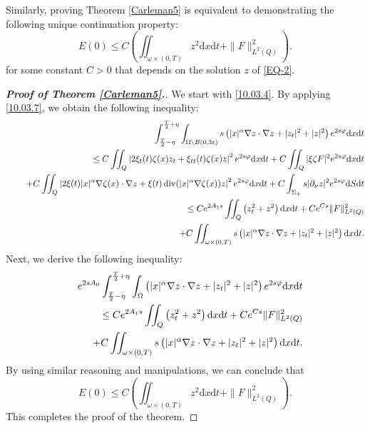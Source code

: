 \documentclass[11pt]{article}
\numberwithin{equation}{section}
\def\pt{\partial}
\def\e{\varepsilon }
\def\vp{\varphi}
\def\bf{\textbf}
\def\pt{\partial}
\def\om{\omega}
\def\Om{\Omega}
\def\al{\alpha}
\def\ts{\times}
\def\f{\frac}
\def\se{\setminus}
\def\df{\mathrm d}
\DeclareMathOperator{\Div}{div}
\begin{document}
		Similarly, proving Theorem \ref{Carleman5} is equivalent to demonstrating the following unique continuation property:
		\begin{equation*}
			E(0)\leq C\left(\iint_{\om\ts (0,T)} z^2\df x\df t+\|F\|_{L^2(Q)}^2\right).
		\end{equation*}
		for some constant $C>0$ that  depends on the solution $z$ of \eqref{EQ-2}.
		\begin{proof}[\rm \bf{{\bf Proof of Theorem \ref{Carleman5}.}}]	
			We start with \eqref{10.03.4}. By applying \eqref{10.03.7}, we obtain the following inequality:
			\begin{eqnarray}\label{10.03.6}
				&&\int_{\f{T}{2}-\eta}^{\f{T}{2}+\eta}\int_{\Om\se B(0,3\e)} s\left(|x|^\al \nabla z\cdot \nabla z +|z_t|^2+|z|^2\right)e^{2s\vp}\df x\df t \nonumber\\
				&&\leq C\iint_Q \left|2\xi_t(t)\zeta(x)z_t+\xi_{tt}(t)\zeta(x)z\right|^2e^{2s\vp}\df x\df t+C\iint_Q|\xi\zeta F|^2 e^{2s\vp}\df x\df t\nonumber \\
				&&\hspace{4.5mm}+C\iint_Q\left|2\xi(t)|x|^\al \nabla \zeta(x)\cdot \nabla z+\xi(t) \Div(|x|^\al \nabla \zeta(x))z\right|^2e^{2s\vp}\df x\df t+C\int_{\Sigma_+} s|\pt_\nu z|^2e^{2s\vp}\df S\df t
				\nonumber \\
				&&\leq Ce^{2A_1s}\iint_Q\left(z_t^2+z^2\right)\df x\df t+Ce^{Cs}\|F\|_{L^2(Q)}^2 \nonumber\\
				&&\hspace{4.5mm} +C\iint_{\om\ts (0,T)}s\left(|x|^\al \nabla z\cdot \nabla z+|z_t|^2+|z|^2\right)\df x\df t.
			\end{eqnarray}
			Next, we derive the following inequality:
			\begin{eqnarray*}
				&& e^{2sA_0}\int_{\f{T}{2}-\eta}^{\f{T}{2}+\eta}\int_\Om \left(|x|^\al \nabla z\cdot \nabla z +|z_t|^2+|z|^2\right)e^{2s\vp}\df x\df t\\
				&&\leq Ce^{2A_1s}\iint_Q\left(z_t^2+z^2\right)\df x\df t+Ce^{Cs}\|F\|_{L^2(Q)}^2\\
				&&\hspace{4.5mm} +C\iint_{\om\ts (0,T)}s\left(|x|^\al \nabla z\cdot \nabla z+|z_t|^2+|z|^2\right)\df x\df t.
			\end{eqnarray*}
			By using similar reasoning and manipulations, we can conclude that
			\begin{equation*}
				E(0)\leq C\left(\iint_{\om\ts (0,T)} z^2\df x\df t+\|F\|_{L^2(Q)}^2\right).
			\end{equation*}
			This completes the proof of the theorem.
		\end{proof}
		
\end{document}
